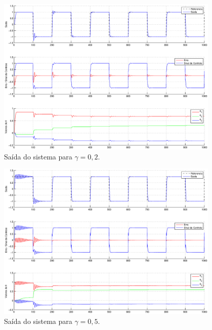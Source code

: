 \begin{figure}[htb]
    \centering
    \includegraphics[width=0.95\textwidth]{imgs/questao3/saida_gamma_0.2.eps}
    \caption{Saída do sistema para $\gamma = 0,2$.}
    \label{fig:q3_saida_gamma_0.2}
\end{figure}

\begin{figure}[H]
    \centering
    \includegraphics[width=0.95\textwidth]{imgs/questao3/saida_gamma_0.5.eps}
    \caption{Saída do sistema para $\gamma = 0,5$.}
    \label{fig:q3_saida_gamma_0.5}
\end{figure}

